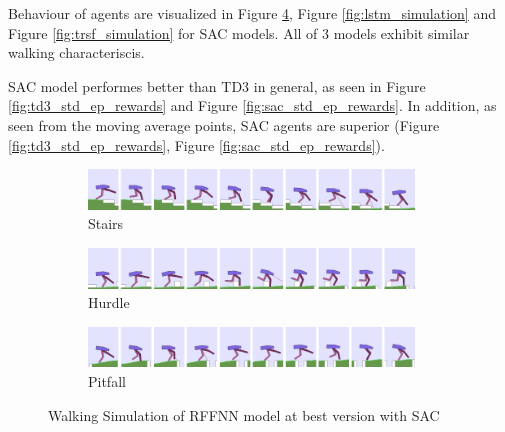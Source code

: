\documentclass[a4paper, 12pt]{article} %
\begin{document}
Behaviour of agents are visualized in Figure \ref{fig:rffnn_simulation}, Figure \ref{fig:lstm_simulation} and Figure \ref{fig:trsf_simulation} for SAC models. 
All of 3 models exhibit similar walking characteriscis.

SAC model performes better than TD3 in general, as seen in Figure \ref{fig:td3_std_ep_rewards} and Figure \ref{fig:sac_std_ep_rewards}. 
In addition, as seen from the moving average points, SAC agents are superior (Figure \ref{fig:td3_std_ep_rewards}, Figure \ref{fig:sac_std_ep_rewards}).

\begin{figure}[!ht]
	\centering
	\begin{subfigure}{.95\textwidth}
		\centering
		\includegraphics[width=0.95\textwidth]{figures/bipedal/anim/ff-stairs.png}
		\caption{Stairs}
		\label{fig:anim_rffnn_stairs}
	\end{subfigure}
	\begin{subfigure}{.95\textwidth}
		\centering
		\includegraphics[width=0.95\textwidth]{figures/bipedal/anim/ff-hurdle.png}
		\caption{Hurdle}
		\label{fig:anim_rffnn_hurdle}
	\end{subfigure}
	\begin{subfigure}{.95\textwidth}
		\centering
		\includegraphics[width=0.95\textwidth]{figures/bipedal/anim/ff-pitfall.png}
		\caption{Pitfall}
		\label{fig:anim_rffnn_pitfall}
	\end{subfigure}
	\caption{Walking Simulation of RFFNN model at best version with SAC}
	\label{fig:rffnn_simulation}
\end{figure}
\end{document}
